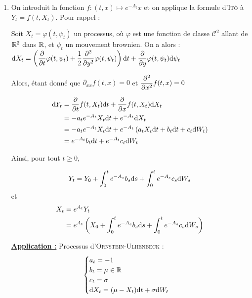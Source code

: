 \begin{enumerate}
\item On introduit la fonction $f : (t,x) \mapsto e^{-A_t}x$ et on applique la formule d'\textsc{Itô} à $Y_t = f(t,X_t)$. Pour rappel :

\begin{prop}[Itô]
Soit $X_t = \varphi(t,\psi_t)$ un processus, où $\varphi$ est une fonction de classe $\mathcal{C}^2$ allant de $\mathbb{R}^2$ dans $\mathbb{R}$, et $\psi_t$ un mouvement brownien.
On a alors :
$\mathrm{d} X_t = \left(\dfrac{\partial }{\partial t}\varphi(t,\psi_t) + \dfrac{1}{2}\dfrac{\partial^2}{\partial y^2}\varphi(t,\psi_t)\right) \mathrm{d} t + \dfrac{\partial}{\partial y}\varphi(t,\psi_t) \mathrm{d} \psi_t $
\end{prop}

Alors, étant donné que $\partial_{xx} f(t,x) = 0$ et $\displaystyle\frac{\partial^2}{\partial x^2} f(t,x) = 0 $

\begin{equation*}
\begin{split}
  \mathrm{d} Y_t &= \frac{\partial}{\partial t} f(t,X_t) \mathrm{d} t + \frac{\partial}{\partial x}f(t,X_t) \mathrm{d} X_t \\
  &= -a_t e^{-A_t} X_t \mathrm{d} t + e^{-A_t} \mathrm{d} X_t \\
  &= -a_t e^{-A_t} X_t \mathrm{d} t + e^{-A_t} \left( a_t X_t \mathrm{d} t + b_t \mathrm{d} t + c_t \mathrm{d} W_t \right) \\
  &= e^{-A_t} b_t \mathrm{d} t + e^{-A_t} c_t \mathrm{d} W_t
\end{split}
\end{equation*}

Ainsi, pour tout $t \geq 0$,

\begin{equation*}
\begin{split}
  Y_t = Y_0 + \int_{0}^{t} e^{-A_s} b_s \mathrm{d} s + \int_{0}^{t} e^{-A_s} c_s \mathrm{d} W_s
\end{split}
\end{equation*}
et 
\begin{equation*}
\begin{split}
  X_t &= e^{A_t}Y_t \\
  &= e^{A_t}\left(X_0 + \int_{0}^{t} e^{-A_s} b_s \mathrm{d} s + \int_{0}^{t} e^{-A_s} c_s \mathrm{d} W_s\right)
\end{split}
\end{equation*}

\underline{\textbf{Application :}} Processus d'\textsc{Ornstein-Ulhenbeck} :
\[ 
\begin{cases}
  a_t = -1 \\
  b_t = \mu \in \mathbb{R} \\
  c_t = \sigma \\
  \mathrm{d} X_t = (\mu - X_t) \mathrm{d} t + \sigma \mathrm{d} W_t
\end{cases}
\]



\end{enumerate}
